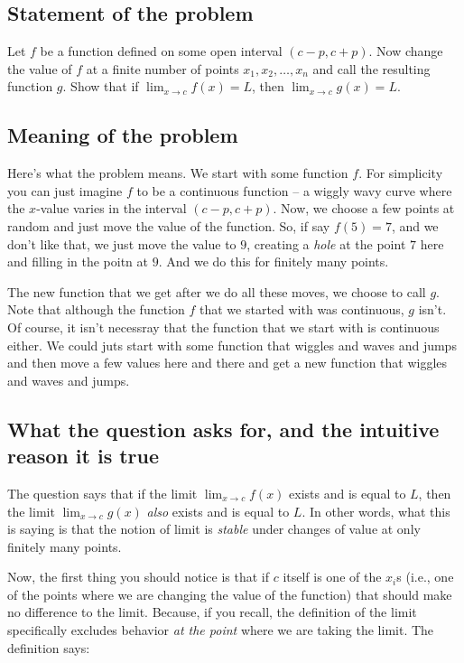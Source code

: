 \documentclass[10pt]{amsart}
\begin{document}
\subsection{Statement of the problem}

Let $f$ be a function defined on some open interval $(c - p, c +
p)$. Now change the value of $f$ at a finite number of points $x_1,
x_2, \dots, x_n$ and call the resulting function $g$. Show that if
$\lim_{x \to c} f(x) = L$, then $\lim_{x \to c} g(x) = L$.

\subsection{Meaning of the problem}

Here's what the problem means. We start with some function $f$. For
simplicity you can just imagine $f$ to be a continuous function -- a
wiggly wavy curve where the $x$-value varies in the interval $(c - p,
c + p)$. Now, we choose a few points at random and just move the value
of the function. So, if say $f(5) = 7$, and we don't like that, we
just move the value to $9$, creating a {\em hole} at the point $7$
here and filling in the poitn at $9$. And we do this for finitely many
points.

The new function that we get after we do all these moves, we choose to
call $g$. Note that although the function $f$ that we started with was
continuous, $g$ isn't. Of course, it isn't necessray that the function
that we start with is continuous either. We could juts start with some
function that wiggles and waves and jumps and then move a few values
here and there and get a new function that wiggles and waves and jumps.

\subsection{What the question asks for, and the intuitive reason it is true}

The question says that if the limit $\lim_{x \to c} f(x)$ exists and
is equal to $L$, then the limit $\lim_{x \to c} g(x)$ {\em also}
exists and is equal to $L$. In other words, what this is saying is
that the notion of limit is {\em stable} under changes of value at
only finitely many points.

Now, the first thing you should notice is that if $c$ itself is one of
the $x_i$s (i.e., one of the points where we are changing the value of
the function) that should make no difference to the limit. Because, if
you recall, the definition of the limit specifically excludes behavior
{\em at the point} where we are taking the limit. The definition says:
\end{document}
